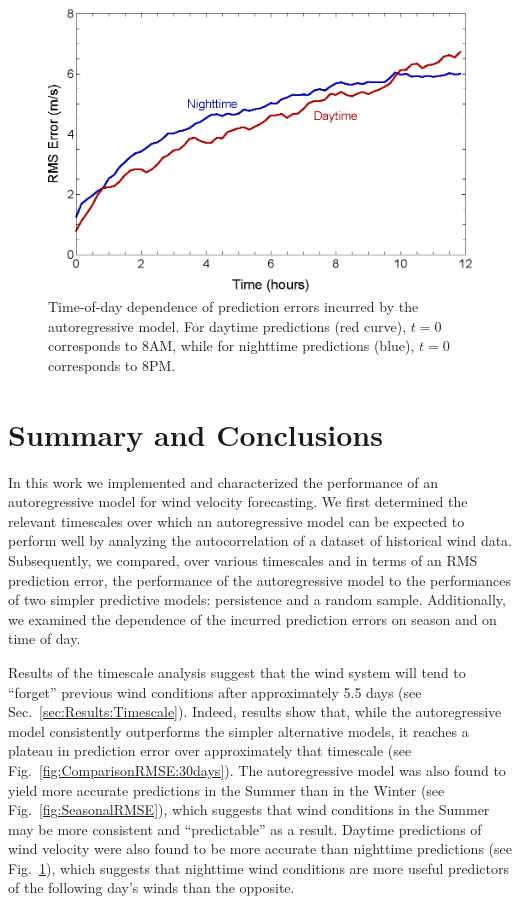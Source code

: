 \documentclass[11pt, oneside]{article}
\newcommand{\figref}[1]{Fig.~\ref{#1}}
\newcommand{\secref}[1]{Sec.~\ref{#1}}
\begin{document}
\begin{figure}[htb]
\centering
\includegraphics[width=0.7\columnwidth]{figures/DiurnalRMSPredictionError}
\caption{Time-of-day dependence of prediction errors incurred by the autoregressive model.
For daytime predictions (red curve), $t = 0$ corresponds to 8AM, while for nighttime predictions (blue), $t = 0$ corresponds to 8PM.}
\label{fig:DiurnalRMSE}
\end{figure} %

\section{Summary and Conclusions}\label{sec:Conclusions}
In this work we implemented and characterized the performance of an autoregressive model for wind velocity forecasting.
We first determined the relevant timescales over which an autoregressive model can be expected to perform well by analyzing the autocorrelation of a dataset of historical wind data.
Subsequently, we compared, over various timescales and in terms of an RMS prediction error, the performance of the autoregressive model to the performances of two simpler predictive models: persistence and a random sample.
Additionally, we examined the dependence of the incurred prediction errors on season and on time of day.

Results of the timescale analysis suggest that the wind system will tend to ``forget'' previous wind conditions after approximately 5.5 days (see \secref{sec:Results:Timescale}).
Indeed, results show that, while the autoregressive model consistently outperforms the simpler alternative models, it reaches a plateau in prediction error over approximately that timescale (see \figref{fig:ComparisonRMSE:30days}).
The autoregressive model was also found to yield more accurate predictions in the Summer than in the Winter (see \figref{fig:SeasonalRMSE}), which suggests that wind conditions in the Summer may be more consistent and ``predictable'' as a result.
Daytime predictions of wind velocity were also found to be more accurate than nighttime predictions (see \figref{fig:DiurnalRMSE}), which suggests that nighttime wind conditions are more useful predictors of the following day's winds than the opposite.
\end{document}
